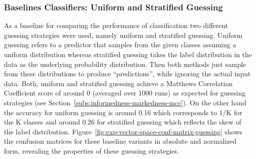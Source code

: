 \subsubsection{Baselines Classifiers: Uniform and Stratified Guessing}
\label{subs:baselines-classifiers}

As a baseline for comparing the performance of classification two different guessing strategies were used, namely uniform and stratified guessing.
Uniform guessing refers to a predictor that samples from the given classes assuming a uniform distribution whereas stratified guessing takes the label distribution in the data as the underlying probability distribution.
Then both methods just sample from these distributions to produce ``predictions'', while ignoring the actual input data. Both, uniform and stratified guessing achieve a Matthews Correlation Coefficient score of around 0 (averaged over 1000 runs) as expected for guessing strategies (see Section~\ref{subs:informedness-markedness-mcc}). On the other hand the accuracy for uniform guessing is around 0.16 which corresponds to $1/\text{K}$ for the K classes and around 0.26 for stratified guessing which reflects the skew of the label distribution.
Figure~\ref{fig:exp-vector-space-conf-matrix-guessing} shows the confusion matrices for these baseline variants in absolute and normalized form, revealing the properties of these guessing strategies.


